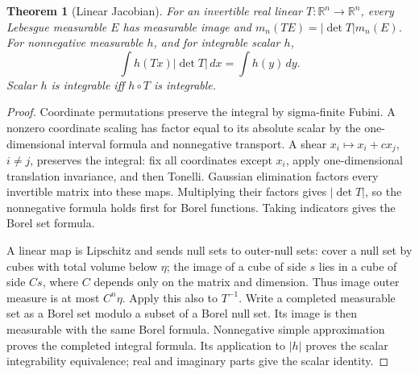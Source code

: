 \documentclass[11pt,oneside,openany]{book}
\newtheorem{theorem}{Theorem}[chapter]
\theoremstyle{definition}
\theoremstyle{remark}
\newcommand{\R}{\mathbb R}\newcommand{\C}{\mathbb C}
\newcommand{\family}[1]{}
\begin{document}
\begin{theorem}[Linear Jacobian]\family{D11.09.linear_jacobian}\label{d11:09:linear-jacobian}
For an invertible real linear $T:\R^n\to\R^n$, every Lebesgue measurable
$E$ has measurable image and $m_n(T E)=|\det T|m_n(E)$. For nonnegative
measurable $h$, and for integrable scalar $h$,
\[
 \int h(Tx)|\det T|\,dx=\int h(y)\,dy.
\]
Scalar $h$ is integrable iff $h\circ T$ is integrable.
\end{theorem}
\begin{proof}
Coordinate permutations preserve the integral by sigma-finite Fubini.
A nonzero coordinate scaling has factor equal to its absolute scalar by
the one-dimensional interval formula and nonnegative transport. A shear
$x_i\mapsto x_i+c x_j$, $i\ne j$, preserves the integral: fix all
coordinates except $x_i$, apply one-dimensional translation invariance,
and then Tonelli. Gaussian elimination factors every invertible matrix
into these maps. Multiplying their factors gives $|\det T|$, so the
nonnegative formula holds first for Borel functions. Taking indicators
gives the Borel set formula.

A linear map is Lipschitz and sends null sets to outer-null sets: cover a
null set by cubes with total volume below $\eta$; the image of a cube of
side $s$ lies in a cube of side $C s$, where $C$ depends only on the
matrix and dimension. Thus image outer measure is at most $C^n\eta$.
Apply this also to $T^{-1}$. Write a completed measurable set as a Borel
set modulo a subset of a Borel null set. Its image is then measurable
with the same Borel formula. Nonnegative simple approximation proves the
completed integral formula. Its application to $|h|$ proves the scalar
integrability equivalence; real and imaginary parts give the scalar identity.
\end{proof}
\end{document}
